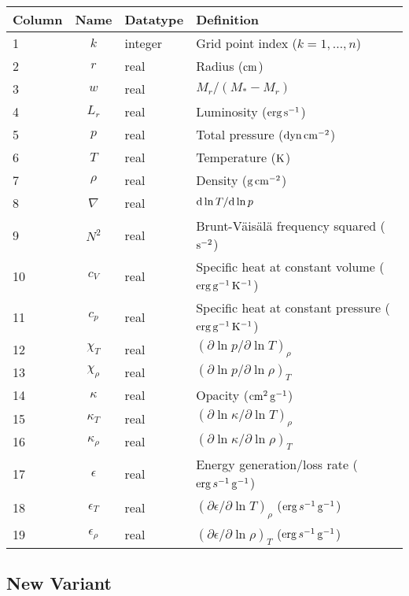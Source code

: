 \documentclass{article}
\newcommand{\diff}{\ensuremath{{\rm d}}}
\newcommand{\Mstar}{\ensuremath{M_{\ast}}}
\newcommand{\cm}{\ensuremath{{\rm cm}}}
\newcommand{\gram}{\ensuremath{{\rm g}}}
\newcommand{\second}{\ensuremath{{\rm s}}}
\newcommand{\dyne}{\ensuremath{{\rm dyn}}}
\newcommand{\erg}{\ensuremath{{\rm erg}}}
\newcommand{\kelvin}{\ensuremath{{\rm K}}}
\begin{document}
\begin{table}[h!]
\begin{tabular}{|l|c|l|l|} \hline
Column & Name & Datatype & Definition \\ \hline
1      & $k$ & integer & Grid point index ($k=1,\ldots,n$) \\
2      & $r$ & real    & Radius ($\cm$) \\
3      & $w$ & real    & $M_{r}/(\Mstar-M_{r})$ \\
4      & $L_{r}$ & real & Luminosity ($\erg\,\second^{-1}$) \\
5      & $p$ & real    & Total pressure ($\dyne\,\cm^{-2}$) \\
6      & $T$ & real    & Temperature ($\kelvin$) \\
7      & $\rho$ & real & Density ($\gram\,\cm^{-2}$) \\
8      & $\nabla$ & real & $\diff \ln T/\diff \ln p$ \\
9      & $N^{2}$ & real & Brunt-V\"ais\"al\"a frequency squared ($\second^{-2}$) \\
10      & $c_{V}$ & real & Specific heat at constant volume ($\erg\,\gram^{-1}\,\kelvin^{-1}$) \\
11     & $c_{p}$ & real & Specific heat at constant pressure ($\erg\,\gram^{-1}\,\kelvin^{-1}$) \\
12     & $\chi_{T}$ & real & $(\partial \ln p/\partial \ln T)_{\rho} $ \\
13     & $\chi_{\rho}$ & real & $(\partial \ln p/\partial \ln \rho)_{T} $ \\
14     & $\kappa$ & real & Opacity ($\cm^{2}\,\gram^{-1}$) \\
15     & $\kappa_{T}$ & real & $(\partial \ln \kappa/\partial \ln T)_{\rho}$ \\
16     & $\kappa_{\rho}$ & real & $(\partial \ln \kappa/\partial \ln \rho)_{T}$ \\
17     & $\epsilon$ & real & Energy generation/loss rate ($\erg\,s^{-1}\,\gram^{-1}$) \\
18     & $\epsilon_{T}$ & real & $(\partial \epsilon/\partial \ln T)_{\rho}$ ($\erg\,s^{-1}\,\gram^{-1}$) \\
19     & $\epsilon_{\rho}$ & real & $(\partial \epsilon/\partial \ln \rho)_{T}$ ($\erg\,s^{-1}\,\gram^{-1}$) \\ \hline
\end{tabular}
\end{table}

\subsection*{New Variant}
\end{document}
